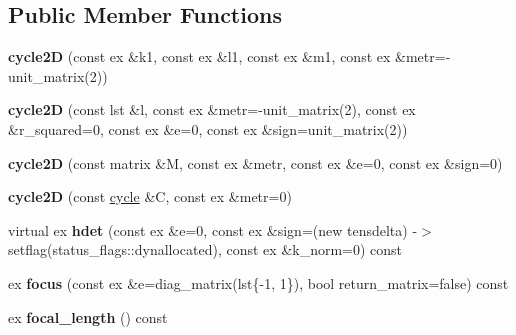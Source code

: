 \subsection*{Public Member Functions}
\begin{DoxyCompactItemize}
\item 
\mbox{\label{class_moeb_inv_1_1cycle2_d_a6d68a6e30401e78728f0b89ab1630921}} 
{\bfseries cycle2D} (const ex \&k1, const ex \&l1, const ex \&m1, const ex \&metr=-\/unit\+\_\+matrix(2))
\item 
\mbox{\label{class_moeb_inv_1_1cycle2_d_af9452b92d2c0e76f6e7d8f45b1ecd44d}} 
{\bfseries cycle2D} (const lst \&l, const ex \&metr=-\/unit\+\_\+matrix(2), const ex \&r\+\_\+squared=0, const ex \&e=0, const ex \&sign=unit\+\_\+matrix(2))
\item 
\mbox{\label{class_moeb_inv_1_1cycle2_d_ad367447c0c69cb23a031ff6252867399}} 
{\bfseries cycle2D} (const matrix \&M, const ex \&metr, const ex \&e=0, const ex \&sign=0)
\item 
\mbox{\label{class_moeb_inv_1_1cycle2_d_a18cf99dad3f906e4a759f5424ae12430}} 
{\bfseries cycle2D} (const \mbox{\hyperlink{class_moeb_inv_1_1cycle}{cycle}} \&C, const ex \&metr=0)
\item 
\mbox{\label{class_moeb_inv_1_1cycle2_d_a657820f5e271de26192593a763624ce2}} 
virtual ex {\bfseries hdet} (const ex \&e=0, const ex \&sign=(new tensdelta) -\/$>$setflag(status\+\_\+flags\+::dynallocated), const ex \&k\+\_\+norm=0) const
\item 
\mbox{\label{class_moeb_inv_1_1cycle2_d_ab96a9e3b049ac9773c2331659e001b57}} 
ex {\bfseries focus} (const ex \&e=diag\+\_\+matrix(lst\{-\/1, 1\}), bool return\+\_\+matrix=false) const
\item 
\mbox{\label{class_moeb_inv_1_1cycle2_d_a40015b98c8423a741470d4e0ea39f8ed}} 
ex {\bfseries focal\+\_\+length} () const
\item 
\mbox{\label{class_moeb_inv_1_1cycle2_d_a6ad3dc95ef86904f04c652e88c6a2712}} 

\end{DoxyCompactItemize}
